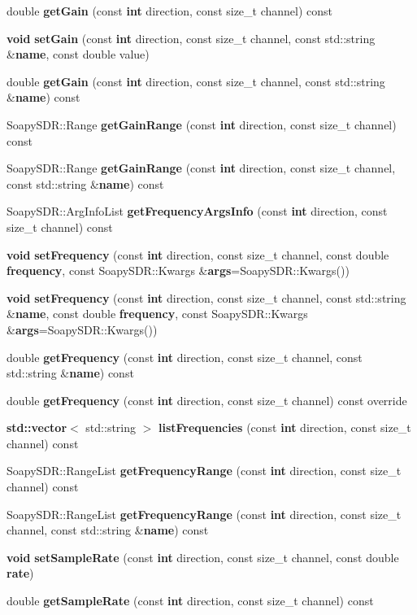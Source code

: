 \begin{DoxyCompactItemize}
\item 
double {\bf get\+Gain} (const {\bf int} direction, const size\+\_\+t channel) const 
\item 
{\bf void} {\bf set\+Gain} (const {\bf int} direction, const size\+\_\+t channel, const std\+::string \&{\bf name}, const double value)
\item 
double {\bf get\+Gain} (const {\bf int} direction, const size\+\_\+t channel, const std\+::string \&{\bf name}) const 
\item 
Soapy\+S\+D\+R\+::\+Range {\bf get\+Gain\+Range} (const {\bf int} direction, const size\+\_\+t channel) const 
\item 
Soapy\+S\+D\+R\+::\+Range {\bf get\+Gain\+Range} (const {\bf int} direction, const size\+\_\+t channel, const std\+::string \&{\bf name}) const 
\item 
Soapy\+S\+D\+R\+::\+Arg\+Info\+List {\bf get\+Frequency\+Args\+Info} (const {\bf int} direction, const size\+\_\+t channel) const 
\item 
{\bf void} {\bf set\+Frequency} (const {\bf int} direction, const size\+\_\+t channel, const double {\bf frequency}, const Soapy\+S\+D\+R\+::\+Kwargs \&{\bf args}=Soapy\+S\+D\+R\+::\+Kwargs())
\item 
{\bf void} {\bf set\+Frequency} (const {\bf int} direction, const size\+\_\+t channel, const std\+::string \&{\bf name}, const double {\bf frequency}, const Soapy\+S\+D\+R\+::\+Kwargs \&{\bf args}=Soapy\+S\+D\+R\+::\+Kwargs())
\item 
double {\bf get\+Frequency} (const {\bf int} direction, const size\+\_\+t channel, const std\+::string \&{\bf name}) const 
\item 
double {\bf get\+Frequency} (const {\bf int} direction, const size\+\_\+t channel) const override
\item 
{\bf std\+::vector}$<$ std\+::string $>$ {\bf list\+Frequencies} (const {\bf int} direction, const size\+\_\+t channel) const 
\item 
Soapy\+S\+D\+R\+::\+Range\+List {\bf get\+Frequency\+Range} (const {\bf int} direction, const size\+\_\+t channel) const 
\item 
Soapy\+S\+D\+R\+::\+Range\+List {\bf get\+Frequency\+Range} (const {\bf int} direction, const size\+\_\+t channel, const std\+::string \&{\bf name}) const 
\item 
{\bf void} {\bf set\+Sample\+Rate} (const {\bf int} direction, const size\+\_\+t channel, const double {\bf rate})
\item 
double {\bf get\+Sample\+Rate} (const {\bf int} direction, const size\+\_\+t channel) const 

\end{DoxyCompactItemize}
